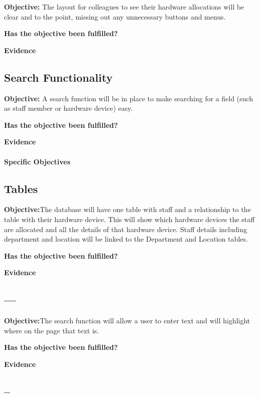 \textbf{Objective:} The layout for colleagues to see their hardware allocations will be clear and to the point, missing out any unnecessary buttons and menus.

\textbf{Has the objective been fulfilled?}

\textbf{Evidence}


\subsection{Search Functionality}

\textbf{Objective:} A search function will be in place to make searching for a field (such as staff member or hardware device) easy.

\textbf{Has the objective been fulfilled?}

\textbf{Evidence}



\paragraph{Specific Objectives}

\subsection{Tables}

\textbf{Objective:}The database will have one table with staff and a relationship to the table with their hardware device. This will show which hardware devices the staff are allocated and all the details of that hardware device. Staff details including department and location will be linked to the Department and Location tables.

\textbf{Has the objective been fulfilled?}

\textbf{Evidence}



\subsection{---}

\textbf{Objective:}The search function will allow a user to enter text and will highlight where on the page that text is.

\textbf{Has the objective been fulfilled?}

\textbf{Evidence}



\subsection{--}

